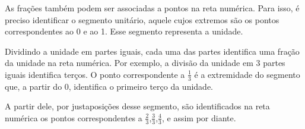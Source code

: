 \documentclass[a4,12pt]{book}
\begin{document}
As frações também podem ser associadas a pontos na reta numérica. Para isso, é preciso identificar o segmento unitário, aquele cujos extremos são os pontos correspondentes ao 0 e ao 1. Esse segmento representa a unidade.
\begin{center}
\end{center}

Dividindo a unidade em partes iguais,  cada uma das partes identifica uma fração da unidade na reta numérica.
Por exemplo, a divisão da unidade em 3 partes iguais identifica terços. O ponto correspondente a $\frac{1}{3}$  é a extremidade do segmento que, a partir do 0, identifica o primeiro terço da unidade. 

\begin{center}
\end{center}


A partir dele, por justaposições desse segmento, são identificados na reta numérica os pontos correspondentes a $\frac{2}{3}$,$\frac{3}{3}$,$\frac{4}{3}$, e assim por diante. 
\end{document}
